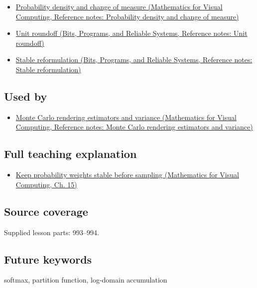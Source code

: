 \begin{itemize}
\tightlist
\item
  \href{../02-Mathematics-for-Visual-Computing/main.pdf\#nameddest=appendix-4815cd87ab8b}{Probability density and change of measure (Mathematics for Visual Computing, Reference notes: Probability density and change of measure)}
\item
  \href{../01-Bits-Programs-and-Reliable-Systems/main.pdf\#nameddest=appendix-bc44f7b42f42}{Unit roundoff (Bits, Programs, and Reliable Systems, Reference notes: Unit roundoff)}
\item
  \href{../01-Bits-Programs-and-Reliable-Systems/main.pdf\#nameddest=appendix-d7f8ba961670}{Stable reformulation (Bits, Programs, and Reliable Systems, Reference notes: Stable reformulation)}
\end{itemize}

\subsection{Used by}\label{appendix-d580b422240f-used-by}

\hypertarget{appendix-d580b422240f-used-by}{}

\begin{itemize}
\tightlist
\item
  \href{../02-Mathematics-for-Visual-Computing/main.pdf\#nameddest=appendix-031e02bf28af}{Monte Carlo rendering estimators and variance (Mathematics for Visual Computing, Reference notes: Monte Carlo rendering estimators and variance)}
\end{itemize}

\subsection{Full teaching explanation}\label{appendix-d580b422240f-full-teaching-explanation}

\hypertarget{appendix-d580b422240f-full-teaching-explanation}{}

\begin{itemize}
\tightlist
\item
  \href{../02-Mathematics-for-Visual-Computing/main.pdf\#nameddest=02-foundations-ii-ch031-keep-probability-weights-stable-before-sampling}{Keep probability weights stable before sampling (Mathematics for Visual Computing, Ch. 15)}
\end{itemize}

\subsection{Source coverage}\label{appendix-d580b422240f-source-coverage}

\hypertarget{appendix-d580b422240f-source-coverage}{}

Supplied lesson parts: 993--994.

\subsection{Future keywords}\label{appendix-d580b422240f-future-keywords}

\hypertarget{appendix-d580b422240f-future-keywords}{}

softmax, partition function, log-domain accumulation
